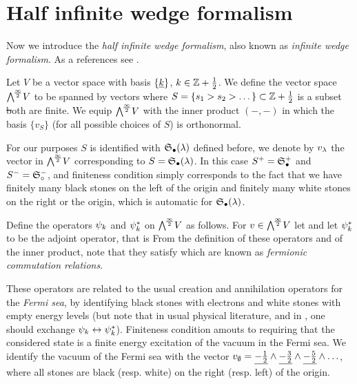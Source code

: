 \documentclass[../main/main.tex]{subfiles}
\begin{document}
\section{Half infinite wedge formalism}

Now we introduce the \emph{half infinite wedge formalism}, also known as \emph{infinite wedge formalism}. As a references see \cite{MJD,O2,J}.

Let $V$ be a vector space with basis $\{\underline{k}\}$, $k\in\mathbb Z+\frac12$. We define the vector space $\bigwedge^{\!\frac\infty2}\!V$ to be spanned by vectors
where $S=\{s_1>s_2>\dots\}\subset\mathbb Z+\frac12$ is a subset \st both
are finite. We equip $\bigwedge^{\!\frac\infty2}\!V$ with the inner product $(-,-)$ in which the basis $\{v_S\}$ (for all possible choices of $S$) is orthonormal. 

For our purposes $S$ is identified with $\mathfrak S_\bullet(\lambda)$ defined before, we denote by $v_\lambda$ the vector in $\bigwedge^{\!\frac\infty2}\!V$ corresponding to $S=\mathfrak S_\bullet(\lambda)$. In this case $S^+=\mathfrak S_\bullet^+$ and $S^-=\mathfrak S_\circ^-$, and finiteness condition simply corresponds to the fact that we have finitely many black stones on the left of the origin and finitely many white stones on the right or the origin, which is automatic for $\mathfrak S_\bullet(\lambda)$. 

Define the operators $\psi_k$ and $\psi_k^*$ on $\bigwedge^{\!\frac\infty2}\!V$ as follows. For $v\in\bigwedge^{\!\frac\infty2}\!V$ let
and let $\psi_k^*$ to be the adjoint operator, that is \st
{}
From the definition of these operators and of the inner product, note that they satisfy
which are known as \emph{fermionic commutation relations}. 

These operators are related to the usual creation and annihilation operators for the \emph{Fermi sea}, by identifying black stones with electrons and white stones with empty energy levels (but note that in usual physical literature, and in \cite{MJD}, one should exchange $\psi_k\leftrightarrow\psi_k^*$). Finiteness condition amouts to requiring that the considered state is a finite energy excitation of the vacuum in the Fermi sea. We identify the vacuum of the Fermi sea with the vector $v_\emptyset=\underline{-\frac12}\wedge\underline{-\frac32}\wedge\underline{-\frac52}\wedge\ldots$, where all stones are black (resp. white) on the right (resp. left) of the origin.
\end{document}
